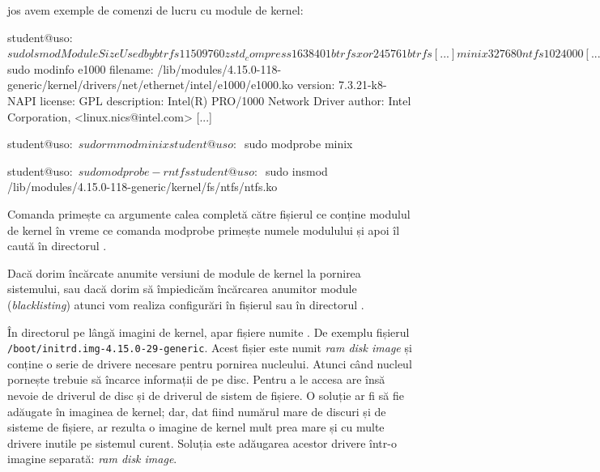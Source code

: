  jos avem exemple de comenzi de lucru cu module de kernel:

\begin{screen}[caption={Lucrul cu module de kernel în Linux},label={lst:boot:modules}]
student@uso:~$ sudo lsmod
Module                  Size  Used by
btrfs                1150976  0
zstd_compress         163840  1 btrfs
xor                    24576  1 btrfs
[...]
minix                  32768  0
ntfs                  102400  0
[...]

student@uso:~$ sudo modinfo e1000
filename:       /lib/modules/4.15.0-118-generic/kernel/drivers/net/ethernet/intel/e1000/e1000.ko
version:        7.3.21-k8-NAPI
license:        GPL
description:    Intel(R) PRO/1000 Network Driver
author:         Intel Corporation, <linux.nics@intel.com>
[...]

student@uso:~$ sudo rmmod minix

student@uso:~$ sudo modprobe minix

student@uso:~$ sudo modprobe -r ntfs

student@uso:~$ sudo insmod /lib/modules/4.15.0-118-generic/kernel/fs/ntfs/ntfs.ko
\end{screen}

Comanda  primește ca argumente calea completă către fișierul ce conține
modulul de kernel în vreme ce comanda modprobe primește numele modulului și apoi
îl caută în directorul .

Dacă dorim încărcate anumite versiuni de module de kernel la pornirea
sistemului, sau dacă dorim să împiedicăm încărcarea anumitor module
(\textit{blacklisting}) atunci vom realiza configurări în fișierul  sau în
directorul .

În directorul  pe lângă imagini de kernel, apar fișiere numite
. De exemplu fișierul \texttt{/boot/initrd.img-4.15.0-29-generic}.
Acest fișier este numit \textit{ram disk image} și conține o serie de drivere
necesare pentru pornirea nucleului. Atunci când nucleul pornește trebuie să
încarce informații de pe disc. Pentru a le accesa are însă nevoie de driverul de
disc și de driverul de sistem de fișiere. O soluție ar fi să fie adăugate în
imaginea de kernel; dar, dat fiind numărul mare de discuri și de sisteme de
fișiere, ar rezulta o imagine de kernel mult prea mare și cu multe drivere
inutile pe sistemul curent. Soluția este adăugarea acestor drivere într-o
imagine separată: \textit{ram disk image}.

